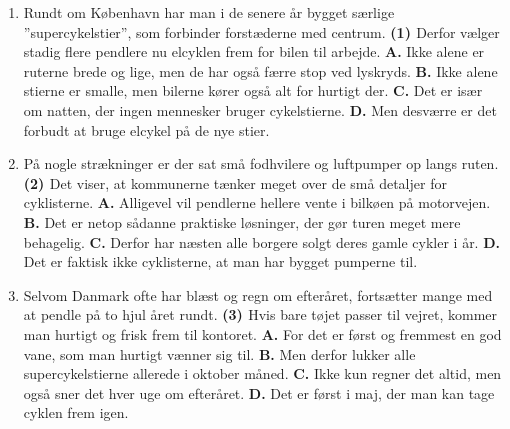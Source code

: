 \begin{enumerate}
  \item Rundt om København har man i de senere år bygget særlige ”supercykelstier”, som forbinder forstæderne med centrum. \textbf{(1) \underline{\hspace{2.6cm}}} Derfor vælger stadig flere pendlere nu elcyklen frem for bilen til arbejde.
  \newline\textbf{A.} Ikke alene er ruterne brede og lige, men de har også færre stop ved lyskryds.
  \newline\textbf{B.} Ikke alene stierne er smalle, men bilerne kører også alt for hurtigt der.
  \newline\textbf{C.} Det er især om natten, der ingen mennesker bruger cykelstierne.
  \newline\textbf{D.} Men desværre er det forbudt at bruge elcykel på de nye stier.
  \item På nogle strækninger er der sat små fodhvilere og luftpumper op langs ruten. \textbf{(2) \underline{\hspace{2.6cm}}} Det viser, at kommunerne tænker meget over de små detaljer for cyklisterne.
  \newline\textbf{A.} Alligevel vil pendlerne hellere vente i bilkøen på motorvejen.
  \newline\textbf{B.} Det er netop sådanne praktiske løsninger, der gør turen meget mere behagelig.
  \newline\textbf{C.} Derfor har næsten alle borgere solgt deres gamle cykler i år.
  \newline\textbf{D.} Det er faktisk ikke cyklisterne, at man har bygget pumperne til.
  \item Selvom Danmark ofte har blæst og regn om efteråret, fortsætter mange med at pendle på to hjul året rundt. \textbf{(3) \underline{\hspace{2.6cm}}} Hvis bare tøjet passer til vejret, kommer man hurtigt og frisk frem til kontoret.
  \newline\textbf{A.} For det er først og fremmest en god vane, som man hurtigt vænner sig til.
  \newline\textbf{B.} Men derfor lukker alle supercykelstierne allerede i oktober måned.
  \newline\textbf{C.} Ikke kun regner det altid, men også sner det hver uge om efteråret.
  \newline\textbf{D.} Det er først i maj, der man kan tage cyklen frem igen.
\end{enumerate}

